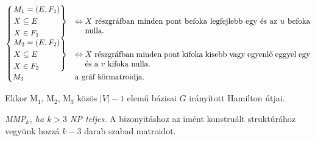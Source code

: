\[
\begin{cases}
\begin{rcases}
M_1=(E,F_1) \\
X \subseteq E \\
X \in F_1
\end{rcases} &\Leftrightarrow \parbox[t]{10cm} {$X$ részgráfban minden pont
befoka legfejlebb egy és az $u$ befoka nulla.} \\
\begin{rcases}
M_2=(E,F_2) \\
X \subseteq E \\
X \in F_2
\end{rcases} &\Leftrightarrow \parbox[t]{10cm} {$X$ részgráfban minden pont
kifoka kisebb vagy egyenlő eggyel egy és a $v$ kifoka nulla.} \\
M_3 &\parbox[t]{10cm} { a gráf körmatroidja.}
\end{cases}
\]

Ekkor M$_1$, M$_2$, M$_3$ közös $|V|-1$ elemű bázisai $G$ irányított Hamilton
útjai.

\vspace{0.4cm}
\emph{MMP$_k$, ha $k>3$ NP teljes.} 
A bizonyitáshoz az imént konstruált struktúrához vegyünk hozzá $k-3$ darab
szabad matroidot.